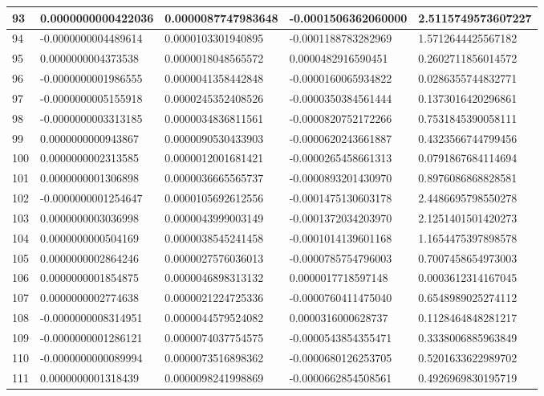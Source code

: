 \begin{center}
\begin{longtable}{|p{0.5cm}|p{3.5cm}|p{3.5cm}|p{3.5cm}|p{3.5cm}|}
\hline
93  & 0.0000000000422036  & 0.0000087747983648  & -0.0001506362060000  & 2.5115749573607227\\
\hline
94  & -0.0000000004489614  & 0.0000103301940895  & -0.0001188783282969  & 1.5712644425567182\\
\hline
95  & 0.0000000004373538  & 0.0000018048565572  & 0.0000482916590451  & 0.2602711856014572\\
\hline
96  & -0.0000000001986555  & 0.0000041358442848  & -0.0000160065934822  & 0.0286355744832771\\
\hline
97  & -0.0000000005155918  & 0.0000245352408526  & -0.0000350384561444  & 0.1373016420296861\\
\hline
98  & -0.0000000003313185  & 0.0000034836811561  & -0.0000820752172266  & 0.7531845390058111\\
\hline
99  & 0.0000000000943867  & 0.0000090530433903  & -0.0000620243661887  & 0.4323566744799456\\
\hline
100  & 0.0000000002313585  & 0.0000012001681421  & -0.0000265458661313  & 0.0791867684114694\\
\hline
101  & 0.0000000001306898  & 0.0000036665565737  & -0.0000893201430970  & 0.8976086868828581\\
\hline
102  & -0.0000000001254647  & 0.0000105692612556  & -0.0001475130603178  & 2.4486695798550278\\
\hline
103  & 0.0000000003036998  & 0.0000043999003149  & -0.0001372034203970  & 2.1251401501420273\\
\hline
104  & 0.0000000000504169  & 0.0000038545241458  & -0.0001014139601168  & 1.1654475397898578\\
\hline
105  & 0.0000000002864246  & 0.0000027576036013  & -0.0000785754796003  & 0.7007458654973003\\
\hline
106  & 0.0000000001854875  & 0.0000046898313132  & 0.0000017718597148  & 0.0003612314167045\\
\hline
107  & 0.0000000002774638  & 0.0000021224725336  & -0.0000760411475040  & 0.6548989025274112\\
\hline
108  & -0.0000000008314951  & 0.0000044579524082  & 0.0000316000628737  & 0.1128464848281217\\
\hline
109  & -0.0000000001286121  & 0.0000074037754575  & -0.0000543854355471  & 0.3338006885963849\\
\hline
110  & -0.0000000000089994  & 0.0000073516898362  & -0.0000680126253705  & 0.5201633622989702\\
\hline
111  & 0.0000000001318439  & 0.0000098241998869  & -0.0000662854508561  & 0.4926969830195719\\

\end{longtable}
\end{center}

